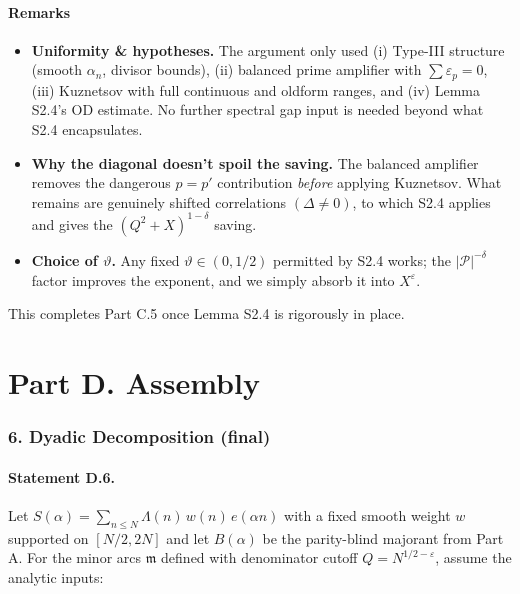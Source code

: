\documentclass[11pt]{article}
\theoremstyle{definition}
\theoremstyle{remark}
\begin{document}
\subsection*{Remarks}

\begin{itemize}
	\item \textbf{Uniformity \& hypotheses.} The argument only used (i) Type-III structure (smooth $\alpha_n$, divisor bounds), (ii) balanced prime amplifier with $\sum \varepsilon_p=0$, (iii) Kuznetsov with full continuous and oldform ranges, and (iv) Lemma S2.4’s OD estimate. No further spectral gap input is needed beyond what S2.4 encapsulates.

	\item \textbf{Why the diagonal doesn’t spoil the saving.} The balanced amplifier removes the dangerous $p=p'$ contribution \emph{before} applying Kuznetsov. What remains are genuinely shifted correlations $(\Delta\neq 0)$, to which S2.4 applies and gives the $(Q^2+X)^{1-\delta}$ saving.

	\item \textbf{Choice of $\vartheta$.} Any fixed $\vartheta\in(0,1/2)$ permitted by S2.4 works; the $|\mathcal P|^{-\delta}$ factor improves the exponent, and we simply absorb it into $X^{\varepsilon}$.
\end{itemize}

This completes Part C.5 once Lemma S2.4 is rigorously in place.

\part*{Part D. Assembly}

\section*{6. Dyadic Decomposition (final)}

\subsection*{Statement D.6.}

Let $S(\alpha)=\sum_{n\le N}\Lambda(n)\,w(n)\,e(\alpha n)$ with a fixed smooth weight $w$ supported on $[N/2,2N]$ and let $B(\alpha)$ be the parity-blind majorant from Part A. For the minor arcs $\mathfrak m$ defined with denominator cutoff $Q=N^{1/2-\varepsilon}$, assume the analytic inputs:
\end{document}

